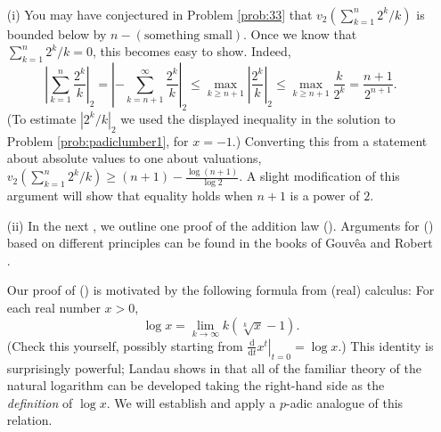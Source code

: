 \begin{rmks}\mbox{ }
\vspace{-0.13in}
\begin{enumerate}
    \item[(i)] You may have conjectured in Problem \ref{prob:33} that $v_2(\sum_{k=1}^{n} 2^k/k)$ is bounded below by $n - (\text{something small})$. Once we know that $\sum_{k=1}^{n} 2^k/k=0$, this becomes easy to show. Indeed, 
    \[ \left|\sum_{k=1}^{n} \frac{2^k}{k}\right|_2 = \left|-\sum_{k=n+1}^{\infty} \frac{2^k}{k}\right|_2\le \max_{k\ge n+1} \left|\frac{2^k}{k}\right|_2 \le \max_{k\ge n+1} \frac{k}{2^k} = \frac{n+1}{2^{n+1}}.\] (To estimate $|2^k/k|_2$ we used the displayed inequality in the solution to Problem \ref{prob:padiclumber1}, for $x=-1$.) Converting this from a statement about absolute values to one about valuations, $v_2(\sum_{k=1}^{n} 2^k/k) \ge (n+1)-\frac{\log(n+1)}{\log{2}}$. A slight modification of this argument will show that equality holds when $n+1$ is a power of $2$.
    \item[(ii)] In the next \pp, we outline one proof of the addition law (\textdagger). Arguments for (\textdagger) based on different principles can be found in the books of Gouv\^{e}a \cite[\S5.7]{gouvea} and Robert \cite[Chapter 5, \S4]{robert}. 
    
    Our proof  of (\textdagger) is motivated by the following formula from (real) calculus: For each real number $x>0$, \[ \log{x} = \lim_{k\to\infty} k(\sqrt[k]{x}-1).\] 
(Check this yourself, possibly starting from $\left.\frac{\mathrm{d}}{\mathrm{d} t} x^{t}\right|_{t=0} = \log{x}$.) This identity is surprisingly powerful; Landau shows in  \cite{landau} that all of the familiar theory of the natural logarithm can be developed taking the right-hand side as the \emph{definition} of $\log{x}$. We will establish and apply a $p$-adic analogue of this relation. 
\end{enumerate}
\end{rmks}


